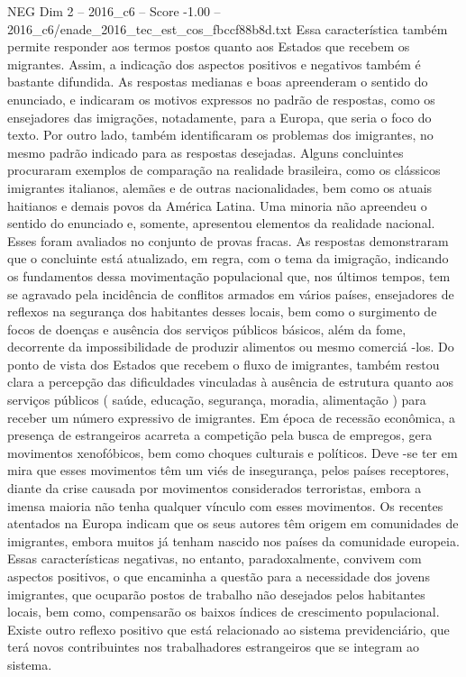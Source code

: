 \begin{textsample}{NEG Dim 2 – 2016\_c6 – Score -1.00 – 2016\_c6/enade\_2016\_tec\_est\_cos\_fbccf88b8d.txt}
Essa característica também permite responder aos termos postos quanto aos Estados que recebem os migrantes.
Assim, a indicação dos aspectos positivos e negativos também é bastante difundida.
As respostas medianas e boas apreenderam o sentido do enunciado, e indicaram os motivos expressos no padrão de respostas, como os ensejadores das imigrações, notadamente, para a Europa, que seria o foco do texto.
Por outro lado, também identificaram os problemas dos imigrantes, no mesmo padrão indicado para as respostas desejadas.
Alguns concluintes procuraram exemplos de comparação na realidade brasileira, como os clássicos imigrantes italianos, alemães e de outras nacionalidades, bem como os atuais haitianos e demais povos da América Latina.
Uma minoria não apreendeu o sentido do enunciado e, somente, apresentou elementos da realidade nacional.
Esses foram avaliados no conjunto de provas fracas.
As respostas demonstraram que o concluinte está atualizado, em regra, com o tema da imigração, indicando os fundamentos dessa movimentação populacional que, nos últimos tempos, tem se agravado pela incidência de conflitos armados em vários países, ensejadores de reflexos na segurança dos habitantes desses locais, bem como o surgimento de focos de doenças e ausência dos serviços públicos básicos, além da fome, decorrente da impossibilidade de produzir alimentos ou mesmo comerciá -los.
Do ponto de vista dos Estados que recebem o fluxo de imigrantes, também restou clara a percepção das dificuldades vinculadas à ausência de estrutura quanto aos serviços públicos ( saúde, educação, segurança, moradia, alimentação ) para receber um número expressivo de imigrantes.
Em época de recessão econômica, a presença de estrangeiros acarreta a competição pela busca de empregos, gera movimentos xenofóbicos, bem como choques culturais e políticos.
Deve -se ter em mira que esses movimentos têm um viés de insegurança, pelos países receptores, diante da crise causada por movimentos considerados terroristas, embora a imensa maioria não tenha qualquer vínculo com esses movimentos.
Os recentes atentados na Europa indicam que os seus autores têm origem em comunidades de imigrantes, embora muitos já tenham nascido nos países da comunidade europeia.
Essas características negativas, no entanto, paradoxalmente, convivem com aspectos positivos, o que encaminha a questão para a necessidade dos jovens imigrantes, que ocuparão postos de trabalho não desejados pelos habitantes locais, bem como, compensarão os baixos índices de crescimento populacional.
Existe outro reflexo positivo que está relacionado ao sistema previdenciário, que terá novos contribuintes nos trabalhadores estrangeiros que se integram ao sistema.

\end{textsample}
